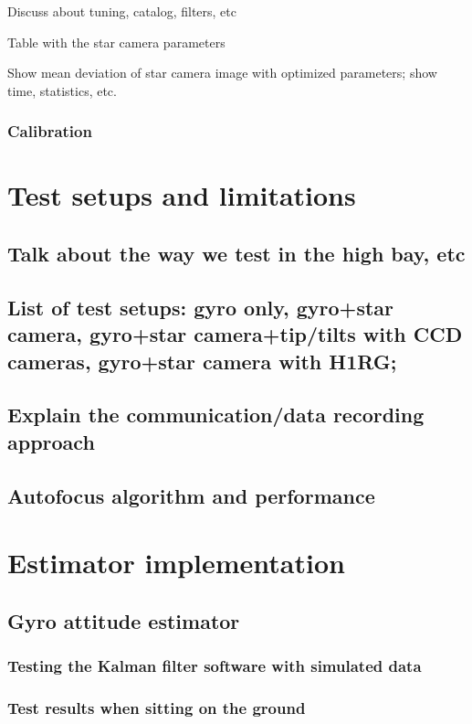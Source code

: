 Discuss about tuning, catalog, filters, etc

Table with the star camera parameters

Show mean deviation of star camera image with optimized parameters;
show time, statistics, etc.

\subsubsection{Calibration}

\section{Test setups and limitations}
\subsection{Talk about the way we test in the high bay, etc}
\subsection{List of test setups: gyro only, gyro+star camera, gyro+star camera+tip/tilts with CCD cameras, gyro+star camera with H1RG;}
\subsection{Explain the communication/data recording approach}

\subsection{Autofocus algorithm and performance}

\section{Estimator implementation}
\subsection{Gyro attitude estimator}


\subsubsection{Testing the Kalman filter software with simulated data}
\subsubsection{Test results when sitting on the ground}
